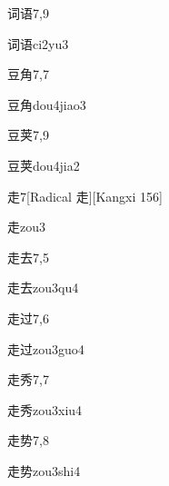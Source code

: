 \begin{entry}{词语}{7,9}
  \begin{phonetics}{词语}{ci2yu3}
  \end{phonetics}
\end{entry}

\begin{entry}{豆角}{7,7}
  \begin{phonetics}{豆角}{dou4jiao3}
  \end{phonetics}
\end{entry}

\begin{entry}{豆荚}{7,9}
  \begin{phonetics}{豆荚}{dou4jia2}
  \end{phonetics}
\end{entry}

\begin{entry}{走}{7}[Radical 走][Kangxi 156]
  \begin{phonetics}{走}{zou3}
  \end{phonetics}
\end{entry}

\begin{entry}{走去}{7,5}
  \begin{phonetics}{走去}{zou3qu4}
  \end{phonetics}
\end{entry}

\begin{entry}{走过}{7,6}
  \begin{phonetics}{走过}{zou3guo4}
  \end{phonetics}
\end{entry}

\begin{entry}{走秀}{7,7}
  \begin{phonetics}{走秀}{zou3xiu4}
  \end{phonetics}
\end{entry}

\begin{entry}{走势}{7,8}
  \begin{phonetics}{走势}{zou3shi4}
  \end{phonetics}
\end{entry}

